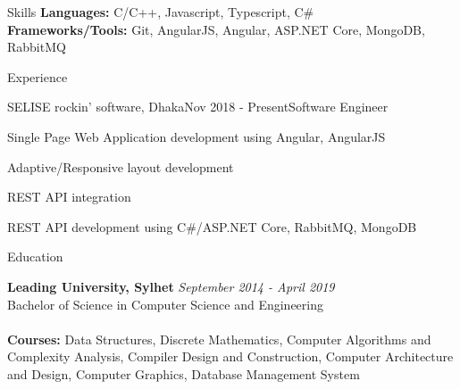 \documentclass{resume}
\begin{document}

\begin{rSection}{Skills}
{\bf Languages:} C/C++, Javascript, Typescript, C\#\\
{\bf Frameworks/Tools:} Git, AngularJS, Angular, ASP.NET Core, MongoDB, RabbitMQ
\end{rSection}


\begin{rSection}{Experience}

\begin{rSubsection}{SELISE rockin' software, Dhaka}{Nov 2018 - Present}{Software Engineer}{}
\item Single Page Web Application development using Angular, AngularJS
\item Adaptive/Responsive layout development
\item REST API integration
\item REST API development using C\#/ASP.NET Core, RabbitMQ, MongoDB
\end{rSubsection}

\end{rSection}


\begin{rSection}{Education}

{\bf Leading University, Sylhet} \hfill {\em September 2014 - April 2019}
\\ Bachelor of Science in Computer Science and Engineering \\
\\{\bf Courses:} Data Structures, Discrete Mathematics, Computer Algorithms and Complexity Analysis, Compiler Design and Construction, Computer Architecture and Design, Computer Graphics, Database Management System 
\end{rSection}


\end{document}
